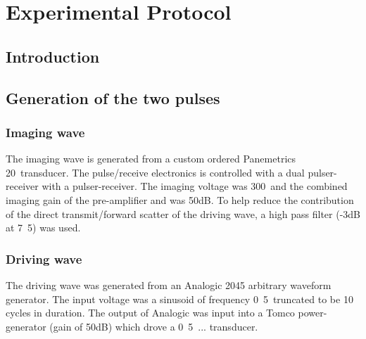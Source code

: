 
\section{Experimental Protocol}\label{sec:DPR500_protocol}





\subsection{Introduction}



\subsection{Generation of the two pulses}
\subsubsection{Imaging wave}
The imaging wave is generated from a custom ordered Panemetrics \unit{20}\mega\hertz\
transducer.
The pulse/receive electronics is controlled 
with a \JsrUltrasonics {} dual pulser-receiver
with a  pulser-receiver.
The imaging voltage was \unit{300}\volt\ and the combined imaging gain 
of the pre-amplifier and \DPR500 was \unit{50}dB.
To help reduce the contribution of the direct transmit/forward scatter of
the driving wave, a high pass filter (-\unit{3}dB at \unit{7.5}\mega\hertz)
was used.

\subsubsection{Driving wave}
The driving wave was generated from an  Analogic 2045 arbitrary waveform generator.
The input voltage was a sinusoid of frequency \unit{0.5}\mega\hertz\ 
truncated to be 10 cycles in duration. 
The output of Analogic was input into a Tomco power-generator (gain of \unit{50}dB)
which drove a \unit{0.5}\mega\hertz\ ... transducer.

